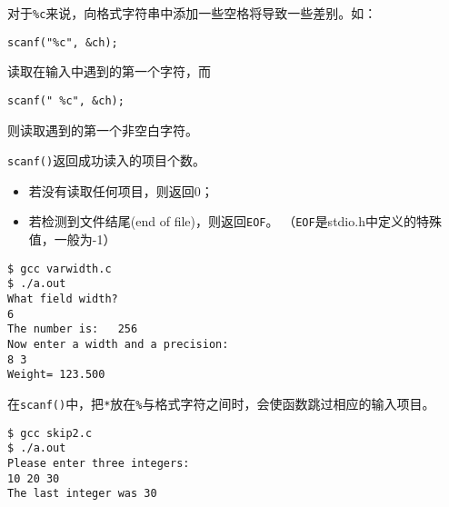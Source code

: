 \begin{frame}[fragile]
对于\lstinline|%c|来说，向格式字符串中添加一些空格将导致一些差别。如：
\begin{lstlisting}[showstringspaces=true,backgroundcolor=\color{red!10}]
scanf("%c", &ch);
\end{lstlisting}
读取在输入中遇到的第一个字符，而
\begin{lstlisting}[showstringspaces=true,backgroundcolor=\color{red!10}]
scanf(" %c", &ch);
\end{lstlisting}
则读取遇到的第一个非空白字符。
\end{frame}

\begin{frame}[fragile]
\lstinline|scanf()|返回成功读入的项目个数。

\begin{itemize}
\item
 若没有读取任何项目，则返回0；
\item
若检测到文件结尾(end of file)，则返回\lstinline|EOF|。
（\lstinline|EOF|是stdio.h中定义的特殊值，一般为-1）
\end{itemize}

\end{frame}

\begin{frame}

\end{frame}

\begin{frame}[fragile]
\begin{lstlisting}[backgroundcolor=\color{red!10}]
$ gcc varwidth.c
$ ./a.out
What field width?
6
The number is:   256
Now enter a width and a precision:
8 3
Weight= 123.500
\end{lstlisting}
\end{frame}

\begin{frame}[fragile]
在\lstinline|scanf()|中，把\lstinline|*|放在\lstinline|%|与格式字符之间时，会使函数跳过相应的输入项目。
\end{frame}

\begin{frame}[fragile]


\end{frame}

\begin{frame}[fragile]
\begin{lstlisting}[backgroundcolor=\color{red!10}]
$ gcc skip2.c
$ ./a.out
Please enter three integers:
10 20 30
The last integer was 30
\end{lstlisting}
\end{frame}





